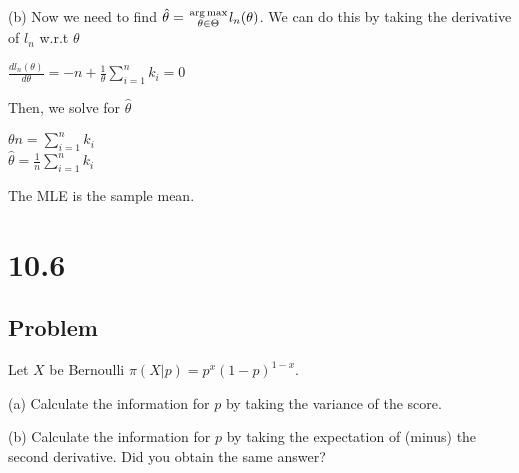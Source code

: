 \documentclass[10pt, a4paper]{article}
\DeclareMathOperator*{\argmax}{arg\,max}
\begin{document}
      (b) Now we need to find $\hat \theta={\argmax\atop{\theta\in\Theta}}l_n(\theta)$. We can do this by taking the derivative of $l_n$ w.r.t $\theta$ 
      \begin{center}
        $\frac{dl_n(\theta)}{d\theta} = -n + \frac{1}{\theta}\sum_{i=1}^n k_i=0$ \\
      \end{center}

      Then, we solve for $\hat\theta$
      \begin{center}
        $\theta n = \sum_{i=1}^n k_i$ \\
        $\boxed{\hat\theta = \frac{1}{n}\sum_{i=1}^n k_i}$
      \end{center}

      The MLE is the sample mean.
    

  \section*{10.6}
    \subsection*{Problem}
      Let $X$ be Bernoulli $\pi(X|p)=p^x(1-p)^{1-x}$.

      (a) Calculate the information for $p$ by taking the variance of the score.

      (b) Calculate the information for $p$ by taking the expectation of (minus) the second derivative. Did you obtain the same answer? 
\end{document}
